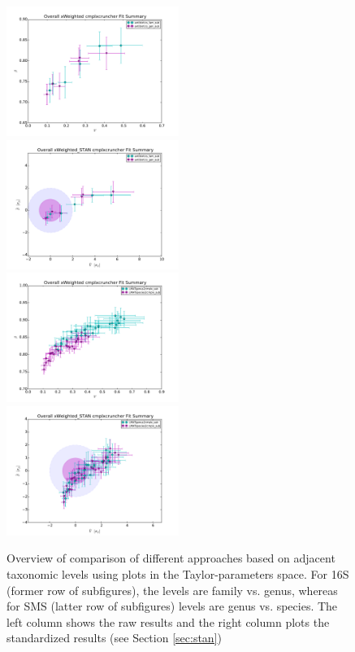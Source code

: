 \begin{figure} 
  \includegraphics[width=0.5\textwidth]{results/taxalevel/sum_raw_16S.pdf}
  \includegraphics[width=0.5\textwidth]{results/taxalevel/sum_sta_16S.pdf}
  \includegraphics[width=0.5\textwidth]{results/taxalevel/sum_raw_SMS.pdf} 
  \includegraphics[width=0.5\textwidth]{results/taxalevel/sum_sta_SMS.pdf}
\caption{Overview of comparison of different approaches based on adjacent taxonomic levels using plots in the Taylor-parameters space. For 16S (former row of subfigures), the levels are family vs. genus, whereas for SMS (latter row of subfigures) levels are genus vs. species. The left column shows the raw results and the right column plots the standardized results (see Section \ref{sec:stan})}
\label{fig:taxlev1}
\end{figure}

